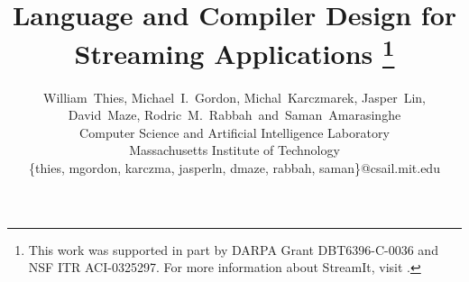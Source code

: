 \documentclass[10pt,twocolumn]{article}
\begin{document}
\title{Language and Compiler Design for Streaming Applications%
\thanks{This work was supported in  part by DARPA Grant DBT6396-C-0036 and NSF
ITR ACI-0325297. For more information about StreamIt, visit \streamiturl.}}

\author{William~Thies, Michael~I.~Gordon, Michal~Karczmarek, Jasper~Lin,\\
 David~Maze, Rodric~M.~Rabbah~and~Saman~Amarasinghe\\
 Computer Science and Artificial Intelligence Laboratory\\
 Massachusetts Institute of Technology\\
 \{thies, mgordon, karczma, jasperln, dmaze, rabbah, saman\}@csail.mit.edu}

\maketitle

\newcommand{\makeline}[0]{\rule{0cm}{0cm}\\\hrule\rule{0cm}{0cm}}


\thispagestyle{empty}

\begin{abstract}

\end{abstract}







%
%
%









%
\end{document}
